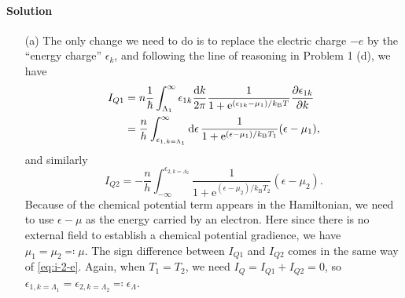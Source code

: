 \documentclass[hyperref, a4paper]{article}
\newcommand*{\ee}{\mathrm{e}}
\begin{document}
\paragraph{Solution} \begin{itemize}
\item[(a)] The only change we need to do is to replace the electric charge $-e$ 
by the ``energy charge'' $\epsilon_{k}$, and following the line of reasoning in Problem 1 (d), 
we have 
\begin{equation}
    \begin{aligned}
        I_{Q1} &= n \frac{1}{\hbar} \int_{\Lambda_1}^{\infty} \epsilon_{1k}
        \frac{\dd{k}}{2\pi} \frac{1}{1 + \ee^{(\epsilon_{1k} - \mu_1) / k_{\text{B}} T}} \pdv{\epsilon_{1k}}{k}  \\
        &= \frac{n}{h} \int^\infty_{\epsilon_{1, k = \Lambda_1}} \dd{\epsilon}  
        \frac{1}{1 + \ee^{(\epsilon - \mu_1) / k_{\text{B}} T_1}}
        (\epsilon - \mu_1),
    \end{aligned}
\end{equation}
and similarly 
\begin{equation}
    I_{Q2} = - \frac{n}{h} \int_{-\infty}^{\epsilon_{2, k = \Lambda_2}} 
    \frac{1}{1 + \ee^{(\epsilon - \mu_2) / k_{\text{B}} T_2}}
    (\epsilon - \mu_2).
\end{equation}
Because of the chemical potential term appears in the Hamiltonian,
we need to use $\epsilon - \mu$ as the energy carried by an electron.
Here since there is no external field to establish a chemical potential gradience,
we have $\mu_1 = \mu_2 \eqqcolon \mu$.
The sign difference between $I_{Q1}$ and $I_{Q2}$ comes in the same way of \eqref{eq:i-2-e}.
Again, when $T_1 = T_2$, 
we need $I_Q = I_{Q1} + I_{Q2} = 0$, 
so $\epsilon_{1, k=\Lambda_1} = \epsilon_{2, k=\Lambda_2} \eqqcolon \epsilon_\Lambda$.


\end{itemize}
\end{document}
